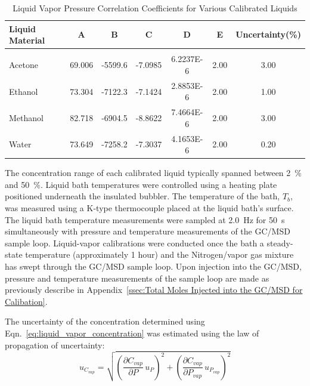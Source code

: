 \documentclass[12pt]{article}
\begin{document}
\begin{table}[!]
\caption{Liquid Vapor Pressure Correlation Coefficients for Various Calibrated Liquids}
\label{tab:Liquid Calibrate_Table}
\centering
	\footnotesize
	\begin{tabular}{lcccccc}
			\hline
\textbf{Liquid Material} &\textbf{A}& \textbf{B}& \textbf{C}&\textbf{D}&\textbf{E}&\textbf{Uncertainty(\%)}\\
\hline
\\[0.001cm]
Acetone	&	69.006	&	-5599.6	&	-7.0985	&	6.2237E-6	& 	2.00	&  3.00\\
Ethanol	&	73.304	&	-7122.3	&	-7.1424	&	2.8853E-6	& 	2.00	&  1.00\\
Methanol	&	82.718	&	-6904.5	&	-8.8622	&	7.4664E-6	& 	2.00	&  3.00\\
Water		&	73.649	&	-7258.2	&	-7.3037	&	4.1653E-6	& 	2.00	&  0.20\\
\hline
\end{tabular}
\end{table}

The concentration range of each calibrated liquid typically spanned between 2~\% and 50~\%. Liquid bath temperatures were controlled using a heating plate positioned underneath the insulated bubbler. The temperature of the bath, $T_{b}$, was measured using a K-type thermocouple placed at the liquid bath's surface. The liquid bath temperature measurements were sampled at \SI{2.0}{\hertz} for \SI{50}{s} simultaneously with pressure and temperature measurements of the GC/MSD sample loop. Liquid-vapor calibrations were conducted once the bath a steady-state temperature (approximately 1 hour) and the Nitrogen/vapor gas mixture has swept through the GC/MSD sample loop. Upon injection into the GC/MSD, pressure and temperature measurements of the sample loop are made as previously describe in Appendix~\ref{ssec:Total Moles Injected into the GC/MSD for Calibation}.

The uncertainty of the concentration determined using Eqn.~\ref{eq:liquid_vapor_concentration} was estimated using the law of propagation of uncertainty:
\begin{equation}
\label{eq:vapor_concentration_uncertainty}
u_{\scriptscriptstyle C_{vap}} = \sqrt{{\left( \frac{\partial C_{vap}}{\partial P}\,u_{\scriptscriptstyle P} \right) }^2+{\left(\frac{\partial C_{vap}}{\partial P_{vap}}\,u_{\scriptscriptstyle P_{vap}}\right)}^2}
\end{equation}
\end{document}
